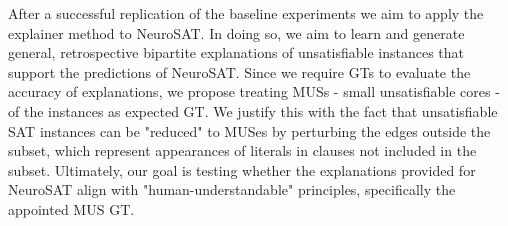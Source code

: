 After a successful replication of the baseline experiments we aim to apply the explainer method to NeuroSAT. In doing so, we aim to learn and generate general, retrospective bipartite explanations of unsatisfiable instances that support the predictions of NeuroSAT. Since we require \acp{GT} to evaluate the accuracy of explanations, we propose treating \acp{MUS} - small unsatisfiable cores - of the instances as expected \ac{GT}. We justify this with the fact that unsatisfiable SAT instances can be "reduced" to MUSes by perturbing the edges outside the subset, which represent appearances of literals in clauses not included in the subset. Ultimately, our goal is testing whether the explanations provided for NeuroSAT align with "human-understandable" principles, specifically the appointed MUS \ac{GT}.